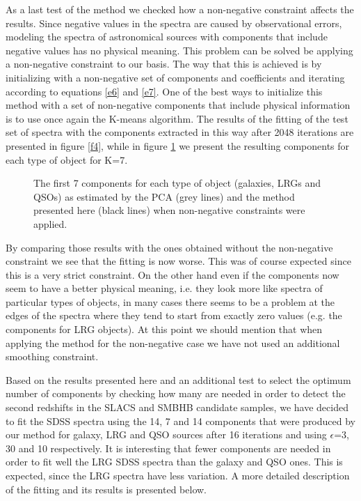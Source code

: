 \documentclass[apj]{emulateapj}
\begin{document}
As a last test of the method we checked how a non-negative constraint affects the results. Since negative values in the spectra are caused by observational errors, modeling the spectra of astronomical sources with components that include negative values has no physical meaning. This problem can be solved be applying a non-negative constraint to our basis. The way that this is achieved is by initializing with a non-negative set of components and coefficients and iterating according to equations \ref{e6} and \ref{e7}. One of the best ways to initialize this method with a set of non-negative components that include physical information is to use once again the K-means algorithm. The results of the fitting of the test set of spectra with the components extracted in this way after 2048 iterations are presented in figure \ref{f4}, while in figure \ref{f5} we present the resulting components for each type of object for K=7.

\begin{figure}[h]
\begin{center}
\caption{The first 7 components for each type of object (galaxies, LRGs and QSOs) as estimated by the PCA (grey lines) and the method presented here (black lines) when non-negative constraints were applied.}
\label{f5}
\end{center}
\end{figure}

By comparing those results with the ones obtained without the non-negative constraint we see that the fitting is now worse. This was of course expected since this is a very strict constraint. On the other hand even if the components now seem to have a better physical meaning, i.e. they look more like spectra of particular types of objects, in many cases there seems to be a problem at the edges of the spectra where they tend to start from exactly zero values (e.g. the components for LRG objects). At this point we should mention that when applying the method for the non-negative case we have not used an additional smoothing constraint.

Based on the results presented here and an additional test to select the optimum number of components by checking how many are needed in order to detect the second redshifts in the SLACS and SMBHB candidate samples, we have decided to fit the SDSS spectra using the 14, 7 and 14 components that were produced by our method for galaxy, LRG and QSO sources after 16 iterations and using $\epsilon$=3, 30 and 10 respectively. It is interesting that fewer components are needed in order to fit well the LRG SDSS spectra than the galaxy and QSO ones. This is expected, since the LRG spectra have less variation. A more detailed description of the fitting and its results is presented below.
\end{document}
